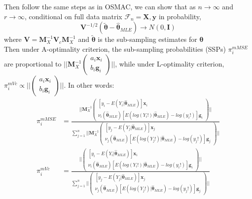 \documentclass[]{article}
\begin{document}
Then follow the same steps as in OSMAC, we can show that as $n \to \infty$ and $r \to \infty$, conditional on full data matrix $\mathcal{F}_n = \boldsymbol{X}, \boldsymbol{y}$ in probability,
$$
\boldsymbol{V}^{-1/2}(\tilde{\boldsymbol{\theta}} - \hat{\boldsymbol{\theta}}_{MLE}) \to N(0, \boldsymbol{I})
$$
where $\boldsymbol{V} = \boldsymbol{M}_X^{-1}\boldsymbol{V}_c\boldsymbol{M}_X^{-1}$ and $\tilde{\boldsymbol{\theta}}$ is the sub-sampling estimates for $\boldsymbol{\theta}$
\\
Then under A-optimality criterion, the sub-sampling probabilities (SSPs) $\pi_i^{mMSE}$ are proportional to $||\boldsymbol{M}_X^{-1}\begin{pmatrix}
	a_i\boldsymbol{x}_i\\b_i\boldsymbol{g}_i
\end{pmatrix}||$, while under L-optimality criterion, $\pi_i^{mVc} \propto ||\begin{pmatrix}
a_i\boldsymbol{x}_i\\b_i\boldsymbol{g}_i
\end{pmatrix}||$. In other words:
\begin{align*}
	\pi_i^{mMSE} &= \frac{||\boldsymbol{M}_X^{-1}\begin{pmatrix}
			[y_i - E(Y_i| \hat{\boldsymbol{\theta}}_{MLE})]\boldsymbol{x}_i\\
			\nu_i(\hat{\boldsymbol{\theta}}_{MLE})[E(log(Y_i!)| \hat{\boldsymbol{\theta}}_{MLE}) - log(y_i!)]\boldsymbol{g}_i
		\end{pmatrix}||}{\sum_{j=1}^{n}||\boldsymbol{M}_X^{-1}\begin{pmatrix}
			[y_j - E(Y_j| \hat{\boldsymbol{\theta}}_{MLE})]\boldsymbol{x}_j\\
			\nu_j(\hat{\boldsymbol{\theta}}_{MLE})[E(log(Y_j!)| \hat{\boldsymbol{\theta}}_{MLE}) - log(y_j!)]\boldsymbol{g}_j
		\end{pmatrix}||}\\
	\pi_i^{mVc} &= \frac{||\begin{pmatrix}
			[y_i - E(Y_i| \hat{\boldsymbol{\theta}}_{MLE})]\boldsymbol{x}_i\\
			\nu_i(\hat{\boldsymbol{\theta}}_{MLE})[E(log(Y_i!)| \hat{\boldsymbol{\theta}}_{MLE}) - log(y_i!)]\boldsymbol{g}_i
		\end{pmatrix}||}{\sum_{j=1}^{n}||\begin{pmatrix}
			[y_j - E(Y_j| \hat{\boldsymbol{\theta}}_{MLE})]\boldsymbol{x}_j\\
			\nu_j(\hat{\boldsymbol{\theta}}_{MLE})[E(log(Y_j!)| \hat{\boldsymbol{\theta}}_{MLE}) - log(y_j!)]\boldsymbol{g}_j
		\end{pmatrix}||}
\end{align*}
\end{document}
